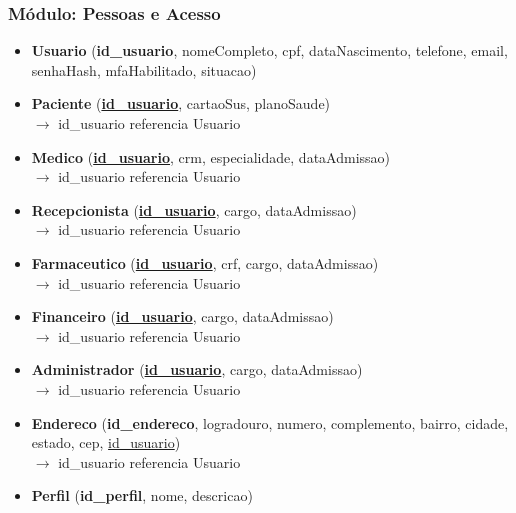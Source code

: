 \subsubsection{Módulo: Pessoas e Acesso}
\begin{itemize}[itemsep=10pt]

    \item \textbf{Usuario} (\textbf{id\_usuario}, nomeCompleto, cpf, dataNascimento, telefone, email, senhaHash, mfaHabilitado, situacao)

    \item \textbf{Paciente} (\textbf{\underline{id\_usuario}}, cartaoSus, planoSaude)
    \\{\small $\rightarrow$ id\_usuario referencia Usuario}


    \item \textbf{Medico} (\textbf{\underline{id\_usuario}}, crm, especialidade, dataAdmissao)
    \\{\small $\rightarrow$ id\_usuario referencia Usuario}

    \item \textbf{Recepcionista} (\textbf{\underline{id\_usuario}}, cargo, dataAdmissao)
    \\{\small $\rightarrow$ id\_usuario referencia Usuario}

    \item \textbf{Farmaceutico} (\textbf{\underline{id\_usuario}}, crf, cargo, dataAdmissao)
    \\{\small $\rightarrow$ id\_usuario referencia Usuario}

    \item \textbf{Financeiro} (\textbf{\underline{id\_usuario}}, cargo, dataAdmissao)
    \\{\small $\rightarrow$ id\_usuario referencia Usuario}

    \item \textbf{Administrador} (\textbf{\underline{id\_usuario}}, cargo, dataAdmissao)
    \\{\small $\rightarrow$ id\_usuario referencia Usuario}

    \item \textbf{Endereco} (\textbf{id\_endereco}, logradouro, numero, complemento, bairro, cidade, estado, cep, \underline{id\_usuario})
    \\{\small $\rightarrow$ id\_usuario referencia Usuario}

    \item \textbf{Perfil} (\textbf{id\_perfil}, nome, descricao)


\end{itemize}
